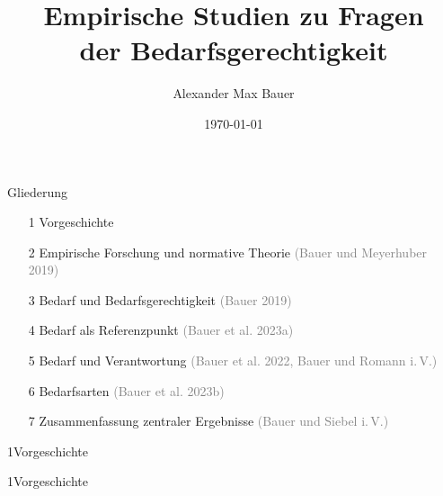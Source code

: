 \documentclass[xcolor=table,9pt,aspectratio=169]{beamer}
\title{Empirische Studien zu Fragen\\der Bedarfsgerechtigkeit}
\subtitle{}
\author{Alexander Max Bauer}
\date{\renewcommand{\dateseparator}{.}\ddmmyyyydate\today}
\begin{document}
{
\begin{frame}
   \maketitle
\end{frame}
}


\begin{frame}{\vspace*{10mm}Gliederung}
\begin{itemize}
   \item[1] \hspace*{1em}Vorgeschichte
   \item[2] \hspace*{1em}Empirische Forschung und normative Theorie \textcolor{gray}{(Bauer und Meyerhuber 2019)}
   \item[3] \hspace*{1em}Bedarf und Bedarfsgerechtigkeit \textcolor{gray}{(Bauer 2019)}
   \item[4] \hspace*{1em}Bedarf als Referenzpunkt \textcolor{gray}{(Bauer et al. 2023a)}
   \item[5] \hspace*{1em}Bedarf und Verantwortung \textcolor{gray}{(Bauer et al. 2022, Bauer und Romann i.\,V.)}
   \item[6] \hspace*{1em}Bedarfsarten \textcolor{gray}{(Bauer et al. 2023b)}
   \item[7] \hspace*{1em}Zusammenfassung zentraler Ergebnisse \textcolor{gray}{(Bauer und Siebel i.\,V.)}
\end{itemize}
\end{frame}


\begin{frame}
\begin{overlayarea}{\textwidth}{0.81\paperheight}{
   \vspace*{11mm}
   \textcolor{uolblue}
   {1\hspace*{1em}Vorgeschichte}
}
\end{overlayarea}
\end{frame}


\begin{frame}{\vspace*{10mm}1\hspace*{1em}Vorgeschichte}
\end{frame}
\end{document}

